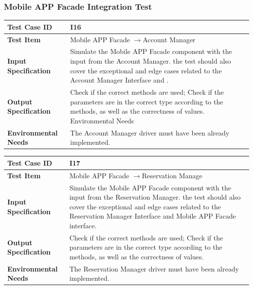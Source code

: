 \documentclass[a4paper,11pt]{article}
\begin{document}
		\subsubsection{Mobile APP Facade Integration Test}
		\begin{table}[H] 
\begin{center}
\renewcommand\arraystretch{1.5}
\begin{tabular}{|p{5cm}|p{7cm}|}
 \hline
\textbf{Test Case ID}& I16\\
 \hline
\textbf{Test Item}&Mobile APP Facade $\rightarrow$Account Manager\\
 \hline
\textbf{Input Specification}&Simulate the Mobile APP Facade component with the input from the Account Manager. the test should also cover the exceptional and edge cases related to the
Account Manager Interface and .\\
 \hline
\textbf{Output Specification}&Check if the correct methods are used;
Check if the parameters are in the correct type according to the methods, as well as the correctness of values.
Environmental Needs\\
 \hline
 \textbf{Environmental Needs}&The Account Manager driver must have been already implemented.\\
 \hline
\end{tabular}
\end{center}
\end{table}		
\begin{table}[H] 
\begin{center}
\renewcommand\arraystretch{1.5}
\begin{tabular}{|p{5cm}|p{7cm}|}
 \hline
\textbf{Test Case ID}& I17\\
 \hline
\textbf{Test Item}&Mobile APP Facade $\rightarrow$Reservation Manage\\
 \hline
\textbf{Input Specification}&Simulate the Mobile APP Facade component with the input from the Reservation Manager. the test should also cover the exceptional and edge cases related to the Reservation Manager Interface and Mobile APP Facade interface.\\
 \hline
\textbf{Output Specification}&Check if the correct methods are used;
Check if the parameters are in the correct type according to the methods, as well as the correctness of values.\\
 \hline
 \textbf{Environmental Needs}&The Reservation Manager driver must have been already implemented.\\
 \hline
\end{tabular}
\end{center}
\end{table}		
\end{document}
